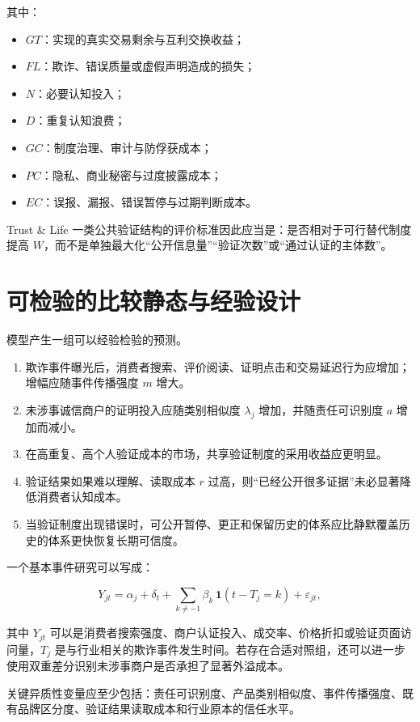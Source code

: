 \documentclass[UTF8,12pt]{ctexart}
\begin{document}
其中：

\begin{itemize}[leftmargin=2.2em]
  \item $GT$：实现的真实交易剩余与互利交换收益；
  \item $FL$：欺诈、错误质量或虚假声明造成的损失；
  \item $N$：必要认知投入；
  \item $D$：重复认知浪费；
  \item $GC$：制度治理、审计与防俘获成本；
  \item $PC$：隐私、商业秘密与过度披露成本；
  \item $EC$：误报、漏报、错误暂停与过期判断成本。
\end{itemize}

Trust \& Life 一类公共验证结构的评价标准因此应当是：是否相对于可行替代制度提高 $W$，而不是单独最大化“公开信息量”“验证次数”或“通过认证的主体数”。

\section{可检验的比较静态与经验设计}

模型产生一组可以经验检验的预测。

\begin{enumerate}[leftmargin=2.2em]
  \item 欺诈事件曝光后，消费者搜索、评价阅读、证明点击和交易延迟行为应增加；增幅应随事件传播强度 $m$ 增大。
  \item 未涉事诚信商户的证明投入应随类别相似度 $\lambda_j$ 增加，并随责任可识别度 $a$ 增加而减小。
  \item 在高重复、高个人验证成本的市场，共享验证制度的采用收益应更明显。
  \item 验证结果如果难以理解、读取成本 $r$ 过高，则“已经公开很多证据”未必显著降低消费者认知成本。
  \item 当验证制度出现错误时，可公开暂停、更正和保留历史的体系应比静默覆盖历史的体系更快恢复长期可信度。
\end{enumerate}

一个基本事件研究可以写成：

\[
Y_{jt}
=\alpha_j+\delta_t
+\sum_{k\neq -1}\beta_k\,
\mathbf{1}(t-T_j=k)
+\varepsilon_{jt},
\]

其中 $Y_{jt}$ 可以是消费者搜索强度、商户认证投入、成交率、价格折扣或验证页面访问量，$T_j$ 是与行业相关的欺诈事件发生时间。若存在合适对照组，还可以进一步使用双重差分识别未涉事商户是否承担了显著外溢成本。

关键异质性变量应至少包括：责任可识别度、产品类别相似度、事件传播强度、既有品牌区分度、验证结果读取成本和行业原本的信任水平。
\end{document}
